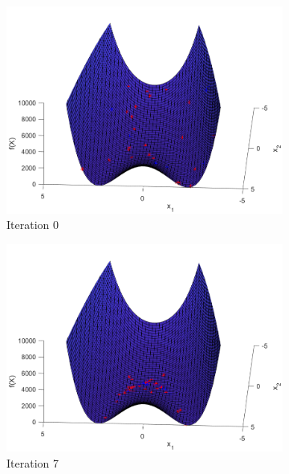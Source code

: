 \begin{figure}
  \centering
  \begin{subfigure}[b]{0.4\textwidth}
    \includegraphics[width=\textwidth]{img/smpl/rosn2d-1-100/loa-iter-0}
    \caption{Iteration 0}
    \label{fig:s5-iter-0}
  \end{subfigure}
  \begin{subfigure}[b]{0.4\textwidth}
    \includegraphics[width=\textwidth]{img/smpl/rosn2d-1-100/loa-iter-7}
    \caption{Iteration 7}
    \label{fig:s5-iter-1}
  \end{subfigure}
  \begin{subfigure}[b]{0.4\textwidth}

\end{subfigure}
\end{figure}
